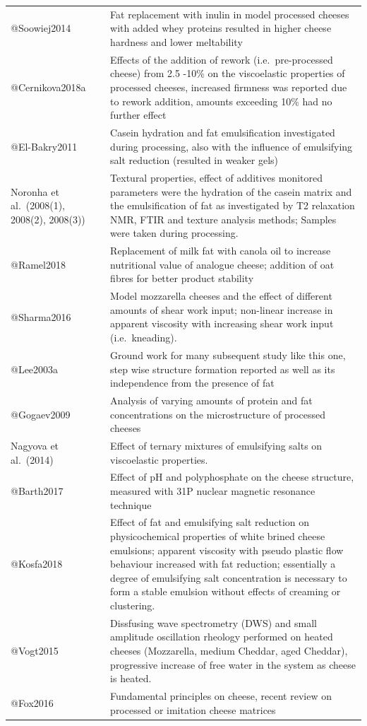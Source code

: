 \documentclass[
]{article}
\begin{document}
\begin{longtable}[]{@{}
  >{\raggedright\arraybackslash}p{}
  >{\raggedright\arraybackslash}p{}@{}}
@Soowiej2014 & Fat replacement with inulin in model processed cheeses
with added whey proteins resulted in higher cheese hardness and lower
meltability \\
@Cernikova2018a & Effects of the addition of rework (i.e.~pre-processed
cheese) from 2.5 -10\% on the viscoelastic properties of processed
cheeses, increased firmness was reported due to rework addition, amounts
exceeding 10\% had no further effect \\
@El-Bakry2011 & Casein hydration and fat emulsification investigated
during processing, also with the influence of emulsifying salt reduction
(resulted in weaker gels) \\
Noronha et al.~(2008(1), 2008(2), 2008(3)) & Textural properties, effect
of additives monitored parameters were the hydration of the casein
matrix and the emulsification of fat as investigated by T2 relaxation
NMR, FTIR and texture analysis methods; Samples were taken during
processing. \\
@Ramel2018 & Replacement of milk fat with canola oil to increase
nutritional value of analogue cheese; addition of oat fibres for better
product stability \\
@Sharma2016 & Model mozzarella cheeses and the effect of different
amounts of shear work input; non-linear increase in apparent viscosity
with increasing shear work input (i.e.~kneading). \\
@Lee2003a & Ground work for many subsequent study like this one, step
wise structure formation reported as well as its independence from the
presence of fat \\
@Gogaev2009 & Analysis of varying amounts of protein and fat
concentrations on the microstructure of processed cheeses \\
Nagyova et al.~(2014) & Effect of ternary mixtures of emulsifying salts
on viscoelastic properties. \\
@Barth2017 & Effect of pH and polyphosphate on the cheese structure,
measured with 31P nuclear magnetic resonance technique \\
@Kosfa2018 & Effect of fat and emulsifying salt reduction on
physicochemical properties of white brined cheese emulsions; apparent
viscosity with pseudo plastic flow behaviour increased with fat
reduction; essentially a degree of emulsifying salt concentration is
necessary to form a stable emulsion without effects of creaming or
clustering. \\
@Vogt2015 & Dissfusing wave spectrometry (DWS) and small amplitude
oscillation rheology performed on heated cheeses (Mozzarella, medium
Cheddar, aged Cheddar), progressive increase of free water in the system
as cheese is heated. \\
@Fox2016 & Fundamental principles on cheese, recent review on processed
or imitation cheese matrices \\
\bottomrule
\end{longtable}
\end{document}

